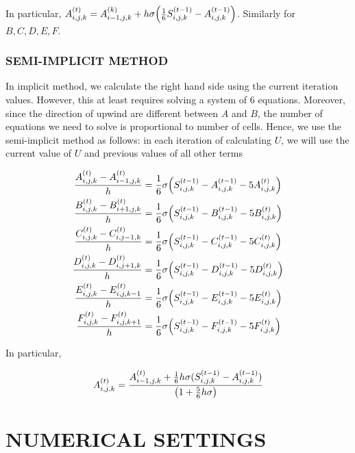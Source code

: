 In particular, $A_{i, j, k}^{(t)} = A_{i-1, j, k}^{(k)} + h \sigma \tuple*{\frac{1}{6} S_{i, j, k}^{(t-1)} - A_{i, j, k}^{(t-1)}}$. Similarly for $B, C, D, E, F$.

\subsubsection{SEMI-IMPLICIT METHOD}

In implicit method, we calculate the right hand side using the current iteration values. However, this at least requires solving a system of $6$ equations. Moreover, since the direction of upwind are different between $A$ and $B$, the number of equations we need to solve is proportional to number of cells. Hence, we use the semi-implicit method as follows: in each iteration of calculating $U$, we will use the current value of $U$ and previous values of all other terms

\begin{align*}
	\frac{A_{i, j, k}^{(t)} - A_{i-1, j, k}^{(t)}}{h} &= \frac{1}{6}\sigma \tuple*{S_{i, j, k}^{(t-1)} - A_{i, j, k}^{(t-1)} - 5 A_{i, j, k}^{(t)}} \\
	\frac{B_{i, j, k}^{(t)} - B_{i+1, j, k}^{(t)}}{h} &= \frac{1}{6}\sigma \tuple*{S_{i, j, k}^{(t-1)} - B_{i, j, k}^{(t-1)} - 5 B_{i, j, k}^{(t)}} \\
	\frac{C_{i, j, k}^{(t)} - C_{i, j-1, k}^{(t)}}{h} &= \frac{1}{6}\sigma \tuple*{S_{i, j, k}^{(t-1)} - C_{i, j, k}^{(t-1)} - 5 C_{i, j, k}^{(t)}} \\
	\frac{D_{i, j, k}^{(t)} - D_{i, j+1, k}^{(t)}}{h} &= \frac{1}{6}\sigma \tuple*{S_{i, j, k}^{(t-1)} - D_{i, j, k}^{(t-1)} - 5 D_{i, j, k}^{(t)}} \\
	\frac{E_{i, j, k}^{(t)} - E_{i, j, k-1}^{(t)}}{h} &= \frac{1}{6}\sigma \tuple*{S_{i, j, k}^{(t-1)} - E_{i, j, k}^{(t-1)} - 5 E_{i, j, k}^{(t)}} \\
	\frac{F_{i, j, k}^{(t)} - F_{i, j, k+1}^{(t)}}{h} &= \frac{1}{6}\sigma \tuple*{S_{i, j, k}^{(t-1)} - F_{i, j, k}^{(t-1)} - 5 F_{i, j, k}^{(t)}}
\end{align*}

In particular,


$$
	A_{i, j, k}^{(t)} = \frac{A_{i-1, j, k}^{(t)} + \frac{1}{6} h\sigma (S_{i, j, k}^{(t-1)} - A_{i, j, k}^{(t-1)})}{\tuple*{1 + \frac{5}{6} h \sigma}}
$$




\section{NUMERICAL SETTINGS}

